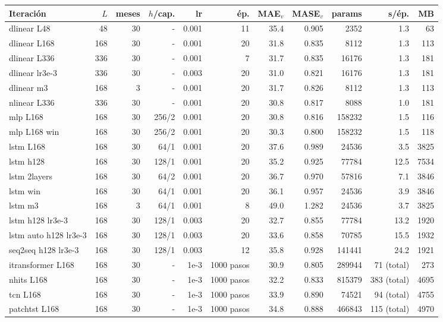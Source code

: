 \begin{tabular}{@{}lrrrrrrrrrr@{}}
\toprule
Iteración & $L$ & meses & $h$/cap. & lr & ép. & MAE$_v$ & MASE$_v$ & params & s/ép. & MB \\ \midrule
dlinear L48 & 48 & 30 & - & 0.001 & 11 & 35.4 & 0.905 & 2352 & 1.3 & 63 \\
dlinear L168 & 168 & 30 & - & 0.001 & 20 & 31.8 & 0.835 & 8112 & 1.3 & 113 \\
dlinear L336 & 336 & 30 & - & 0.001 & 7 & 31.7 & 0.835 & 16176 & 1.3 & 181 \\
dlinear lr3e-3 & 336 & 30 & - & 0.003 & 20 & 31.0 & 0.821 & 16176 & 1.3 & 181 \\
dlinear m3 & 168 & 3 & - & 0.001 & 20 & 31.7 & 0.826 & 8112 & 1.3 & 113 \\
nlinear L336 & 336 & 30 & - & 0.001 & 20 & 30.8 & 0.817 & 8088 & 1.0 & 181 \\
mlp L168 & 168 & 30 & 256/2 & 0.001 & 20 & 30.8 & 0.816 & 158232 & 1.5 & 116 \\
mlp L168 win & 168 & 30 & 256/2 & 0.001 & 20 & 30.3 & 0.800 & 158232 & 1.5 & 118 \\
lstm L168 & 168 & 30 & 64/1 & 0.001 & 20 & 37.6 & 0.989 & 24536 & 3.5 & 3825 \\
lstm h128 & 168 & 30 & 128/1 & 0.001 & 20 & 35.2 & 0.925 & 77784 & 12.5 & 7534 \\
lstm 2layers & 168 & 30 & 64/2 & 0.001 & 20 & 36.7 & 0.970 & 57816 & 7.1 & 3846 \\
lstm win & 168 & 30 & 64/1 & 0.001 & 20 & 36.1 & 0.957 & 24536 & 3.9 & 3846 \\
lstm m3 & 168 & 3 & 64/1 & 0.001 & 8 & 49.0 & 1.282 & 24536 & 3.7 & 3825 \\
lstm h128 lr3e-3 & 168 & 30 & 128/1 & 0.003 & 20 & 32.7 & 0.855 & 77784 & 13.2 & 1920 \\
lstm auto h128 lr3e-3 & 168 & 30 & 128/1 & 0.003 & 20 & 33.6 & 0.858 & 70785 & 15.5 & 1932 \\
seq2seq h128 lr3e-3 & 168 & 30 & 128/1 & 0.003 & 12 & 35.8 & 0.928 & 141441 & 24.2 & 1921 \\
\midrule
itransformer L168 & 168 & 30 & - & 1e-3 & 1000 pasos & 30.9 & 0.805 & 289944 & 71 (total) & 273 \\
nhits L168 & 168 & 30 & - & 1e-3 & 1000 pasos & 32.2 & 0.833 & 815379 & 383 (total) & 4695 \\
tcn L168 & 168 & 30 & - & 1e-3 & 1000 pasos & 33.9 & 0.890 & 74521 & 94 (total) & 4755 \\
patchtst L168 & 168 & 30 & - & 1e-3 & 1000 pasos & 34.8 & 0.888 & 466843 & 115 (total) & 4970 \\

\end{tabular}
